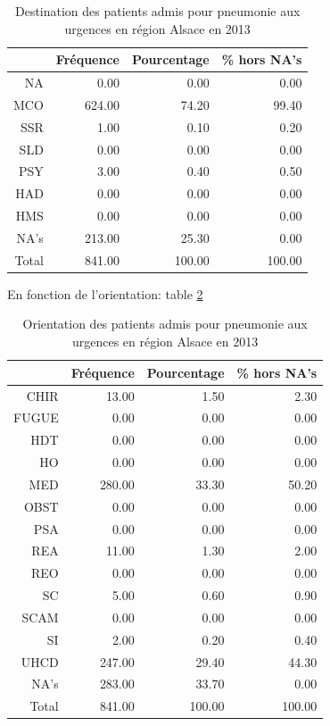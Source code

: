\documentclass[12pt,english,french,twoside]{book}\usepackage[]{graphicx}\usepackage[]{color}
\begin{document}
\begin{table}[ht]
\centering
\begin{tabular}{rrrr}
  \hline
 & Fréquence & Pourcentage & \% hors NA's \\ 
  \hline
NA & 0.00 & 0.00 & 0.00 \\ 
  MCO & 624.00 & 74.20 & 99.40 \\ 
  SSR & 1.00 & 0.10 & 0.20 \\ 
  SLD & 0.00 & 0.00 & 0.00 \\ 
  PSY & 3.00 & 0.40 & 0.50 \\ 
  HAD & 0.00 & 0.00 & 0.00 \\ 
  HMS & 0.00 & 0.00 & 0.00 \\ 
  NA's & 213.00 & 25.30 & 0.00 \\ 
    Total & 841.00 & 100.00 & 100.00 \\ 
   \hline
\end{tabular}
\caption[Pneumonies et service d'hospitalisation]{Destination des patients admis pour pneumonie aux urgences en région Alsace en 2013} 
\label{tab:pneumo_dest}
\end{table}


En fonction de l'orientation: table \ref{tab:pneumo_orient}

\begin{table}[ht]
\centering
\begin{tabular}{rrrr}
  \hline
 & Fréquence & Pourcentage & \% hors NA's \\ 
  \hline
CHIR & 13.00 & 1.50 & 2.30 \\ 
  FUGUE & 0.00 & 0.00 & 0.00 \\ 
  HDT & 0.00 & 0.00 & 0.00 \\ 
  HO & 0.00 & 0.00 & 0.00 \\ 
  MED & 280.00 & 33.30 & 50.20 \\ 
  OBST & 0.00 & 0.00 & 0.00 \\ 
  PSA & 0.00 & 0.00 & 0.00 \\ 
  REA & 11.00 & 1.30 & 2.00 \\ 
  REO & 0.00 & 0.00 & 0.00 \\ 
  SC & 5.00 & 0.60 & 0.90 \\ 
  SCAM & 0.00 & 0.00 & 0.00 \\ 
  SI & 2.00 & 0.20 & 0.40 \\ 
  UHCD & 247.00 & 29.40 & 44.30 \\ 
  NA's & 283.00 & 33.70 & 0.00 \\ 
    Total & 841.00 & 100.00 & 100.00 \\ 
   \hline
\end{tabular}
\caption[Pneumonies et service d'hospitalisation]{Orientation des patients admis pour pneumonie aux urgences en région Alsace en 2013} 
\label{tab:pneumo_orient}
\end{table}
\end{document}
